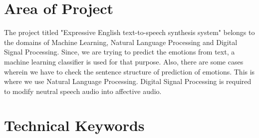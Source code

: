 \documentclass[oneside,a4paper,12pt]{book}
\begin{document}
\section{Area of Project}
The project titled "Expressive English text-to-speech synthesis system" belongs to the domains of Machine Learning, Natural Language Processing and Digital Signal Processing. Since, we are trying to predict the emotions from text, a machine learning classifier is used for that purpose. Also, there are some cases wherein we have to check the sentence structure of prediction of emotions. This is where we use Natural Language Processing. Digital Signal Processing is required to modify neutral speech audio into affective audio.

\section{Technical Keywords}
\end{document}
